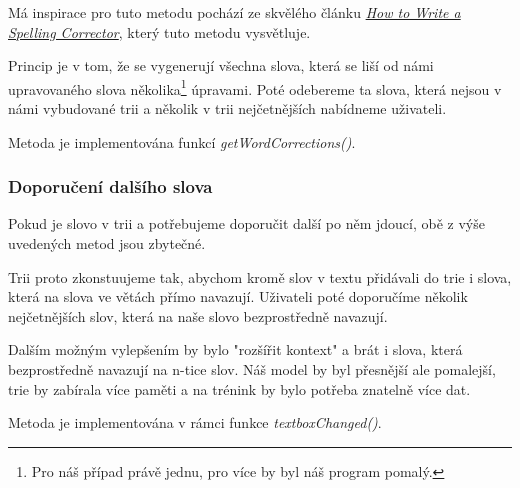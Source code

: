\documentclass[a4paper, 12pt]{article}
\begin{document}
  Má inspirace pro tuto metodu pochází ze skvělého článku \textit{\href{http://norvig.com/spell-correct.html}{How to Write a Spelling Corrector}}, který tuto metodu vysvětluje.

  Princip je v tom, že se vygenerují všechna slova, která se liší od námi upravovaného slova několika\footnote{Pro náš případ právě jednu, pro více by byl náš program pomalý.} úpravami. Poté odebereme ta slova, která nejsou v námi vybudované trii a několik v trii nejčetnějších nabídneme uživateli.

  Metoda je implementována funkcí \textit{getWordCorrections()}.

  \subsubsection{Doporučení dalšího slova}
  Pokud je slovo v trii a potřebujeme doporučit další po něm jdoucí, obě z výše uvedených metod jsou zbytečné.

  Trii proto zkonstuujeme tak, abychom kromě slov v textu přidávali do trie i slova, která na slova ve větách přímo navazují. Uživateli poté doporučíme několik nejčetnějších slov, která na naše slovo bezprostředně navazují.

  Dalším možným vylepšením by bylo "rozšířit kontext" a brát i slova, která bezprostředně navazují na n-tice slov. Náš model by byl přesnější ale pomalejší, trie by zabírala více paměti a na trénink by bylo potřeba znatelně více dat.

  Metoda je implementována v rámci funkce \textit{textboxChanged()}.
\end{document}
